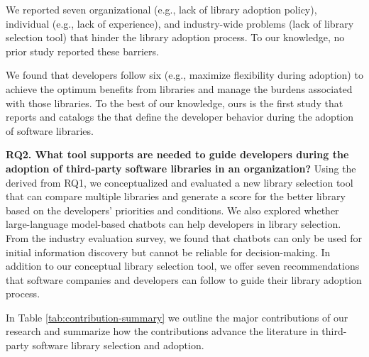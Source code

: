 \documentclass[manuscript,review,screen, table]{acmart}
\def\bf{\textbf}
\newcommand{\nd}{\vspace{1mm}\noindent}
\newcounter{recommendation}[section]
\begin{document}
We reported seven organizational (e.g., lack of library adoption policy), individual (e.g., lack of experience), and industry-wide problems (lack of library selection tool) that hinder the library adoption process. To our knowledge, no prior study reported these barriers.

We found that developers follow six \principle\space (e.g., maximize flexibility during adoption) to achieve the optimum benefits from libraries and manage the burdens associated with those libraries. To the best of our knowledge, ours is the first study that reports and catalogs the \principle\space that define the developer behavior during the adoption of software libraries.


    



\nd\bf{{RQ2. What tool supports are needed to guide developers during the adoption of third-party software libraries in an organization?}} Using the derived \model\space from RQ1, we conceptualized and evaluated a new library selection tool that can compare multiple libraries and generate a score for the better library based on the developers' priorities and conditions. We also explored whether large-language model-based chatbots can help developers in library selection. From the industry evaluation survey, we found that chatbots can only be used for initial information discovery but cannot be reliable for decision-making. In addition to our conceptual library selection tool, we offer seven recommendations that software companies and developers can follow to guide their library adoption process. 

In Table \ref{tab:contribution-summary} we outline the major contributions of our research and summarize how the contributions advance the literature in third-party software library selection and adoption.
\end{document}
